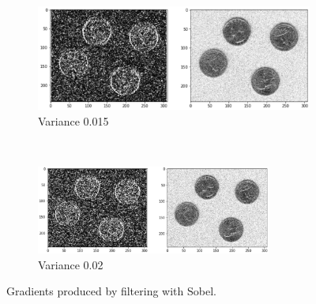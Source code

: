 \begin{figure}[H]
	\centering
	\begin{subfigure}[b]{0.85\textwidth}
		\centering
		\includegraphics[width=\textwidth]{Materials/svar015}
		\caption{Variance 0.015}
	\end{subfigure}
	\hfill
	\\
	\begin{subfigure}[b]{\textwidth}
		\centering
		\includegraphics[width=0.85\textwidth]{Materials/svar02}
		\caption{Variance 0.02}
	\end{subfigure}
	\caption{Gradients produced by filtering with Sobel.}
	\label{sobel2}
\end{figure}

